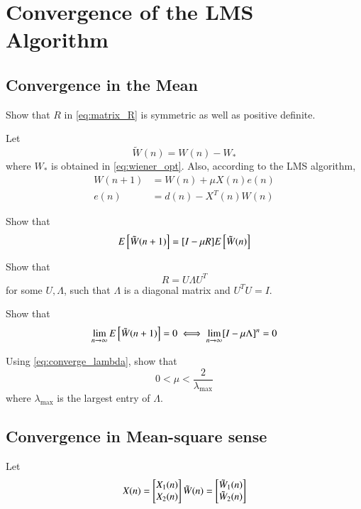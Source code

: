 \documentclass[journal,12pt,twocolumn]{IEEEtran}
\begin{document}
\section{Convergence of the LMS Algorithm}
\subsection{Convergence in the Mean}
\begin{problem}
Show that $R$ in \eqref{eq:matrix_R} is symmetric as well as positive definite.
\end{problem}
%
Let
\begin{equation}
\tilde W(n)= W(n) - W_{*}
\end{equation}
%
where $W_{*}$ is obtained in \eqref{eq:wiener_opt}. Also, according to the LMS algorithm,
\begin{align}
\label{eq:wn_update}
W(n+1)&=W(n)+ \mu X(n) e(n)
\\
e(n) &= d(n) - X^{T}(n)W(n)
\end{align}
%
\begin{problem}
%
Show that
\begin{equation}
 E{}\left[\tilde W(n+1)\right]=[I - \mu R]E{}\left[\tilde W(n)\right]
\end{equation}
\end{problem}
\begin{problem}
Show that 
\begin{equation}
\label{eq:eigen_decompose}
R = U \Lambda U^{T}
\end{equation}
%
for some $U, \Lambda$, such that $\Lambda$ is a diagonal matrix and $U^TU = I$.
\end{problem}
%
\begin{problem}
Show that
\begin{equation}
\label{eq:converge_lambda}
\lim_{n \to \infty}E{}\left[\tilde W(n+1)\right] = 0 \iff \lim_{n\to \infty}[I - \mu \Lambda]^n = 0
\end{equation}
\end{problem}
%
\begin{problem}
Using \eqref{eq:converge_lambda}, show that
\begin{equation}
0 < \mu < \frac{2}{\lambda_{\max}}
\end{equation}
%
where $\lambda_{\max}$ is the largest entry of $\Lambda$.
\end{problem}
%
\subsection{Convergence in Mean-square sense}
Let 
\begin{equation}
 X(n)
 =
  \begin{bmatrix}
   X_1(n) \\ X_2(n)  \end{bmatrix}\\
\tilde W(n)
 =
  \begin{bmatrix}
   \tilde W_1(n) \\ \tilde W_2(n) \end{bmatrix}
\end{equation}
\end{document}
